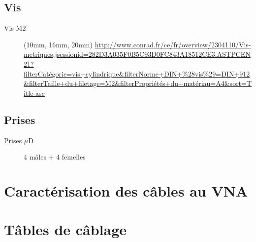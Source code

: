 \documentclass[a4paper,11pt]{article}
\newcommand{\uD}{$\mu$D }
\begin{document}
\subsection{Vis}
\begin{description}
    \item[Vis M2] (10mm, 16mm, 20mm) \url{http://www.conrad.fr/ce/fr/overview/2304110/Vis-metriques;jsessionid=282D3A035F0B5C93D0FC843A18512CE3.ASTPCEN21?filterCatégorie=vis+cylindrique&filterNorme+DIN+%28vis%29=DIN+912&filterTaille+du+filetage=M2&filterPropriétés+du+matériau=A4&sort=Title-asc} 
\end{description}
\subsection{Prises}
\begin{description}
    \item[Prises \uD] 4 mâles + 4 femelles
\end{description}


\section{Caractérisation des câbles au VNA}




\section{Tâbles de câblage}

\end{document}
